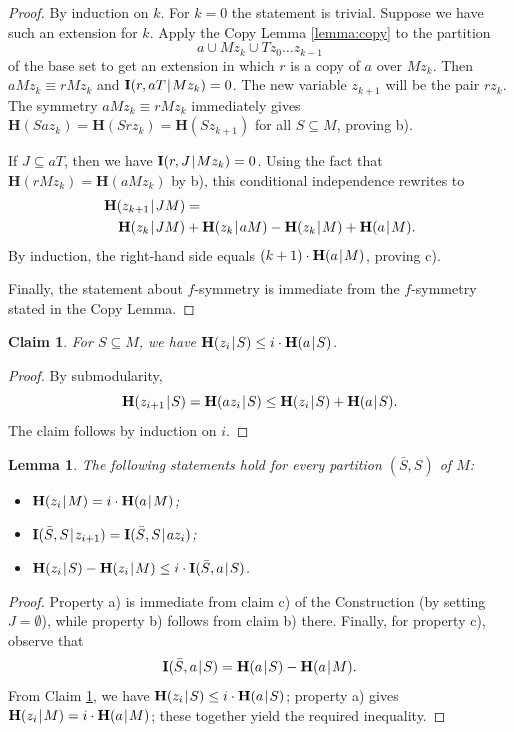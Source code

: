 \documentclass[10pt,a4paper]{amsart}
\def\|{\mskip1.5mu{|}\mskip1.5mu}
\def\H{\mathbf H}
\def\I{\mathbf I}
\newtheorem{lemma}[theorem]{Lemma}
\newtheorem{claim}[theorem]{Claim}
\begin{document}
\begin{proof}
By induction on $k$. For $k=0$ the statement is trivial. Suppose we have
such an extension for $k$. Apply the Copy Lemma \ref{lemma:copy} to the
partition
$$
     a\cup Mz_k \cup Tz_0\dots z_{k-1}
$$
of the base set to get an extension in which $r$ is a copy of $a$ over
$Mz_k$. Then $aMz_k \equiv rMz_k$ and $\I(r,aT\|Mz_k)=0$. The new variable
$z_{k+1}$ will be the pair $rz_k$. The symmetry $aMz_k \equiv rMz_k$
immediately gives $\H(Saz_k)= \H(Srz_k)= \H(Sz_{k+1})$ for all $S\subseteq
M$, proving b).

If $J\subseteq aT$, then we have $\I(r,J\|Mz_k)=0$. Using the fact that $\H(rMz_k)=
\H(aMz_k)$ by b), this conditional independence rewrites to
\begin{align*}
  & \H(z_{k+1}\|JM) = {}\\
  & ~~~ \H(z_k\|JM) + \H(z_k\|aM) - \H(z_k\|M) + \H(a\|M).
\end{align*}
By induction, the right-hand side equals $(k+1)\cdot\H(a\|M)$, proving c).

Finally, the statement about $f$-symmetry is immediate from the $f$-symmetry 
stated in the Copy Lemma.
\end{proof}

\begin{claim}\label{claim:1}
For $S\subseteq M$, we have $\H(z_i\|S)\le i\cdot\H(a\|S)$.
\end{claim}
\begin{proof}
By submodularity, 
$$\H(z_{i+1}\|S)=\H(az_i\|S)\le \H(z_i\|S)+\H(a\|S).$$
The claim follows by induction on $i$.
\end{proof}

\begin{lemma}\label{lemma:D}
The following statements hold for every partition $(\bar S, S)$ of $M$:
\begin{itemize}
\item[a)] $\H(z_i\|M)=i\cdot\H(a\|M)$;
\item[b)] $\I(\bar S,S\|z_{i+1})=\I(\bar S,S\|az_i)$;
\item[c)] $\H(z_i\|S) -\H(z_i\|M) \le i\cdot\I(\bar S,a\|S)$.
\end{itemize}
\end{lemma}
\begin{proof}
Property a) is immediate from claim c) of the Construction (by setting $J=\emptyset$), while property
b) follows from claim b) there. Finally, for property c), observe that
$$
   \I(\bar S,a\|S)=\H(a\|S)-\H(a\|M).
$$
From Claim \ref{claim:1}, we have $\H(z_i\|S)\le i\cdot\H(a\|S)$;
property a) gives $\H(z_i\|M)=i\cdot\H(a\|M)$; these together yield the
required inequality.
\end{proof}
\end{document}
